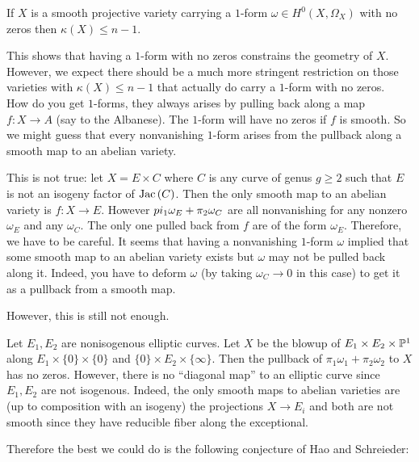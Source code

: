 \documentclass[12pt]{article}
\begin{document}
\begin{theorem}
If $X$ is a smooth projective variety carrying a $1$-form $\omega \in H^0(X, \Omega_X)$ with no zeros then $\kappa(X) \le n-1$. 
\end{theorem}

This shows that having a $1$-form with no zeros constrains the geometry of $X$. However, we expect there should be a much more stringent restriction on those varieties with $\kappa(X) \le n-1$ that actually do carry a $1$-form with no zeros. 
\bigskip\\
How do you get $1$-forms, they always arises by pulling back along a map $f : X \to A$ (say to the Albanese). The $1$-form will have no zeros if $f$ is smooth. So we might guess that every nonvanishing $1$-form arises from the pullback along a smooth map to an abelian variety.

\begin{example}
This is not true: let $X = E \times C$ where $C$ is any curve of genus $g \ge 2$ such that $E$ is not an isogeny factor of $\Jac{C}$. Then the only smooth map to an abelian variety is $f : X \to E$. However $\\pi_1 \omega_E + \pi_2 \omega_C$ are all nonvanishing for any nonzero $\omega_E$ and any $\omega_C$. The only one pulled back from $f$ are of the form $\omega_E$. Therefore, we have to be careful. It seems that having a nonvanishing $1$-form $\omega$ implied that some smooth map to an abelian variety exists but $\omega$ may not be pulled back along it. Indeed, you have to deform $\omega$ (by taking $\omega_C \to 0$ in this case) to get it as a pullback from a smooth map.
\end{example}

However, this is still not enough.

\begin{example}
Let $E_1, E_2$ are nonisogenous elliptic curves. Let $X$ be the blowup of $E_1 \times E_2 \times \P^1$ along $E_1 \times \{ 0 \} \times \{ 0 \}$ and $\{ 0 \} \times E_2 \times \{ \infty \}$. Then the pullback of $\pi_1 \omega_1 + \pi_2 \omega_2$ to $X$ has no zeros. However, there is no ``diagonal map'' to an elliptic curve since $E_1, E_2$ are not isogenous. Indeed, the only smooth maps to abelian varieties are (up to composition with an isogeny) the projections $X \to E_i$ and both are not smooth since they have reducible fiber along the exceptional. 
\end{example}

Therefore the best we could do is the following conjecture of Hao and Schreieder:
\end{document}

